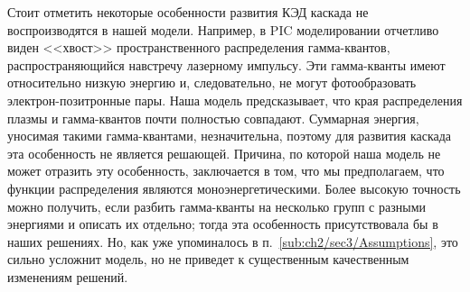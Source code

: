 Стоит отметить некоторые особенности развития КЭД каскада не воспроизводятся в нашей модели.
Например, в PIC моделировании отчетливо виден <<хвост>> пространственного распределения гамма-квантов, распространяющийся навстречу лазерному импульсу.
Эти гамма-кванты имеют относительно низкую энергию и, следовательно, не могут фотообразовать электрон-позитронные пары.
Наша модель предсказывает, что края распределения плазмы и гамма-квантов почти полностью совпадают.
Суммарная энергия, уносимая такими гамма-квантами, незначительна, поэтому для развития каскада эта особенность не является решающей.
Причина, по которой наша модель не может отразить эту особенность, заключается в том, что мы предполагаем, что функции распределения являются моноэнергетическими.
Более высокую точность можно получить, если разбить гамма-кванты на несколько групп с разными энергиями и описать их отдельно; тогда эта особенность присутствовала бы в наших решениях.
Но, как уже упоминалось в п.~\ref{sub:ch2/sec3/Assumptions}, это сильно усложнит модель, но не приведет к существенным качественным изменениям решений.

